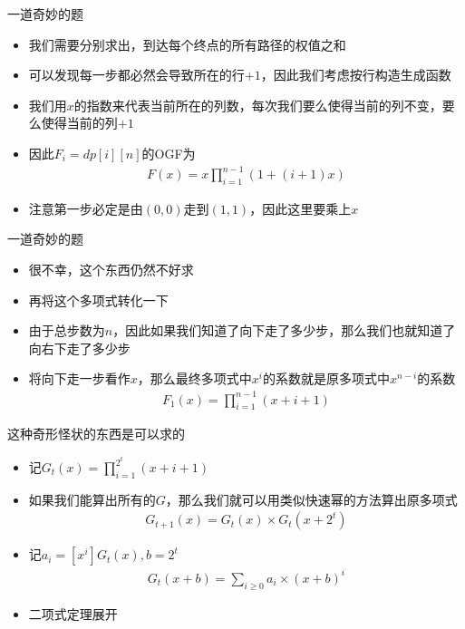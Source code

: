 \documentclass{beamer}
\begin{document}
\begin{frame}{一道奇妙的题}
    \begin{itemize}
        \item 我们需要分别求出，到达每个终点的所有路径的权值之和 \pause
        \item 可以发现每一步都必然会导致所在的行$+1$，因此我们考虑按行构造生成函数 \pause
        \item 我们用$x$的指数来代表当前所在的列数，每次我们要么使得当前的列不变，要么使得当前的列$+1$ \pause
        \item 因此$F_i=dp[i][n]$的OGF为
        $$\begin{aligned}
            F(x) = x\prod_{i = 1} ^ {n - 1}(1 + (i + 1)x)
        \end{aligned}$$ 
        \item 注意第一步必定是由$(0,0)$走到$(1,1)$，因此这里要乘上$x$
    \end{itemize}
\end{frame}

\begin{frame}{一道奇妙的题}
    \begin{itemize}
        \item 很不幸，这个东西仍然不好求 \pause
        \item 再将这个多项式转化一下 \pause
        \item 由于总步数为$n$，因此如果我们知道了向下走了多少步，那么我们也就知道了向右下走了多少步 \pause
        \item 将向下走一步看作$x$，那么最终多项式中$x^i$的系数就是原多项式中$x^{n - i}$的系数 \pause
        $$\begin{aligned}
            F_1(x) = \prod_{i = 1}^{n - 1} (x + i + 1)
        \end{aligned}$$
    \end{itemize}
\end{frame}

\begin{frame}{这种奇形怪状的东西是可以求的}
    \begin{itemize}
        \item 记$G_t(x)=\prod_{i = 1} ^ {2 ^ t} (x + i + 1)$ \pause
        \item 如果我们能算出所有的$G$，那么我们就可以用类似快速幂的方法算出原多项式 \pause
        $$\begin{aligned}
            G_{t + 1}(x) = G_t(x)\times G_t(x + 2^t)
        \end{aligned}$$ \pause
        \item 记$a_i = [x^i]G_t(x),b = 2^t$ \pause
        $$\begin{aligned}
            G_{t}(x + b) = \sum_{i\geq 0}a_i\times (x + b)^i
        \end{aligned}$$ \pause
        \item 二项式定理展开
    \end{itemize}
\end{frame}
\end{document}
